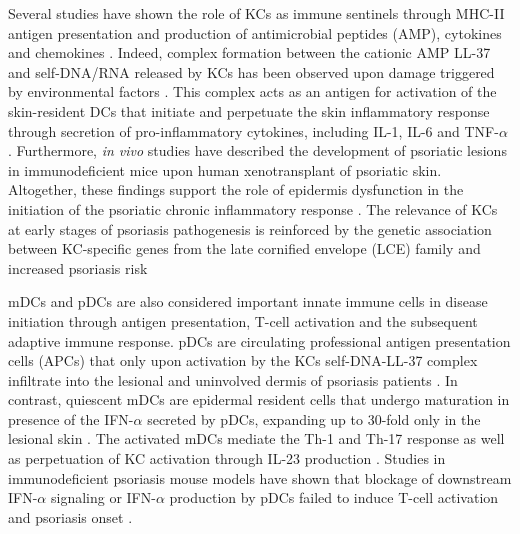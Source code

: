 Several studies have shown the role of KCs as immune sentinels through MHC-II antigen presentation and production of antimicrobial peptides (AMP), cytokines and chemokines \parencite{Black2007}. Indeed, complex formation between the cationic AMP LL-37 and self-DNA/RNA released by KCs has been observed upon damage triggered by environmental factors \parencite{Lande2007}. This complex acts as an antigen for activation of the skin-resident DCs that initiate and perpetuate the skin inflammatory response through secretion of pro-inflammatory cytokines, including IL-1, IL-6 and TNF-$\alpha$ \parencite{Feldmeyer2007, Arend2008, Nestle2009, Nestle2005}. Furthermore, \textit{in vivo} studies have described the development of psoriatic lesions in immunodeficient mice upon human xenotransplant of psoriatic skin\parencite{Boyman2004}. Altogether, these findings support the role of epidermis dysfunction in the initiation of the psoriatic chronic inflammatory response \parencite{Proskch2008}.  The relevance of KCs at early stages of psoriasis pathogenesis is reinforced by the genetic association between KC-specific genes from the late cornified envelope (LCE) family and increased psoriasis risk \parencite{Tsoi2012}

mDCs and pDCs are also considered important innate immune cells in disease initiation through antigen presentation, T-cell activation and the subsequent adaptive immune response\parencite{Mahil20016}. pDCs are circulating professional antigen presentation cells (APCs) that only upon activation by the KCs self-DNA-LL-37 complex infiltrate into the lesional and uninvolved dermis of psoriasis patients \parencite{Nestle2005, Lande2007}. In contrast, quiescent mDCs are epidermal resident cells that undergo maturation in presence of the IFN-$\alpha$ secreted by pDCs, expanding up to 30-fold only in the lesional skin \parencite{Zaba2007}. The activated mDCs mediate the Th-1 and Th-17 response as well as perpetuation of KC activation through IL-23 production \parencite{Lee2004}. Studies in immunodeficient psoriasis mouse models have shown that blockage of downstream IFN-$\alpha$ signaling or IFN-$\alpha$ production by pDCs failed to induce T-cell activation and psoriasis onset \parencite{Nestle2005}. 


